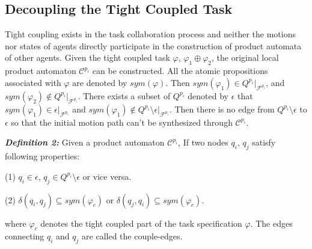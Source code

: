 \documentclass[journal]{IEEEtran}
\begin{document}
\subsection{Decoupling the Tight Coupled Task}
Tight coupling exists in the task collaboration process and neither the motions nor states of agents directly participate in the construction of product automata of other agents. Given the tight coupled task $\varphi$, $\varphi_1 \oplus \varphi_2$, the original local product automaton $\mathcal{C}^{p_i}$ can be constructed. All the atomic propositions associated with $\varphi$ are denoted by $sym(\varphi)$. Then $sym(\varphi_1) \in Q^{p_i}|_{\mathcal{F}^{p_i}}$, and $sym(\varphi_2) \notin Q^{p_i}|_{\mathcal{F}^{p_i}} $. There exists a subset of $Q^{p_i}$ denoted by $\epsilon$ that $sym(\varphi_1) \in \epsilon |_{\mathcal{F}^{p_i}}$ and $sym(\varphi_1) \notin Q^{p_i} \setminus \epsilon |_{\mathcal{F}^{p_i}}$. Then there is no edge from $Q^{p_i} \setminus \epsilon$ to $\epsilon$ so that the initial motion path can't be synthesized through $\mathcal{C}^{p_i}$.\par
\textbf{\emph{Definition 2:}} Given a product automaton $\mathcal{C}^{p_i}$, If two nodes $q_i$, $q_j$ satisfy following properties:
\par
(1) $q_i \in \epsilon$, $q_j \in Q^{p_i} \setminus \epsilon$ or vice versa.\par
(2) $\delta(q_i,q_j)\subseteq sym(\varphi_c)$ or $\delta(q_j,q_i)\subseteq sym(\varphi_c)$.

where $\varphi_c$ denotes the tight coupled part of the task specification $\varphi$.
The edges connecting $q_i$ and $q_j$ are called the couple-edges.
\end{document}
